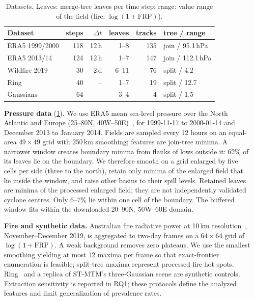 \documentclass[review]{vgtc}                 %
\begin{document}
\begin{table}[t]
\centering\small
\setlength{\tabcolsep}{3.5pt}
\begin{tabular}{lrrrrl}\toprule
Dataset & steps & $\Delta t$ & leaves & tracks & tree / range\\\midrule
ERA5 1999/2000 & 118 & 12\,h & 1--8 & 135 & join / 95.1\,hPa\\
ERA5 2013/14 & 124 & 12\,h & 1--7 & 147 & join / 112.1\,hPa\\
Wildfire 2019 & 30 & 2\,d & 6--11 & 76 & split / 4.2\\
Ring & 40 & -- & 1--7 & 19 & split / 12.7\\
Gaussians & 64 & -- & 3--4 & 4 & split / 1.5\\\bottomrule
\end{tabular}
\caption{Datasets. Leaves: merge-tree leaves per time step; range: value range of the field (fire: $\log(1+\mathrm{FRP})$).}
\label{tab:data}
\end{table}

\textbf{Pressure data} (\cref{tab:data}). We use ERA5 mean sea-level pressure over the North Atlantic and Europe (25--80\textdegree N, 40\textdegree W--50\textdegree E)~\cite{Hersbach:2020:ERA5}, for 1999-11-17 to 2000-01-14 and December 2013 to January 2014. Fields are sampled every 12 hours on an equal-area $49\times49$ grid with 250\,km smoothing; features are join-tree minima. A narrower window creates boundary minima from flanks of lows outside it: 62\% of its leaves lie on the boundary. We therefore smooth on a grid enlarged by five cells per side (three to the north), retain only minima of the enlarged field that lie inside the window, and raise other basins to their spill levels. Retained leaves are minima of the processed enlarged field; they are not independently validated cyclone centres. Only 6--7\% lie within one cell of the boundary. The buffered window fits within the downloaded 20--90\textdegree N, 50\textdegree W--60\textdegree E domain.

\textbf{Fire and synthetic data.} Australian fire radiative power at 10\,km resolution~\cite{Franke:2021:1DP}, November--December 2019, is aggregated to two-day frames on a $64\times64$ grid of $\log(1+\mathrm{FRP})$. A weak background removes zero plateaus. We use the smallest smoothing yielding at most 12 maxima per frame so that exact-frontier enumeration is feasible; split-tree maxima represent processed fire hot spots. Ring~\cite{Koepp:2023:TMTM,Franke:2021:1DP} and a replica of ST-MTM's three-Gaussian scene are synthetic controls. Extraction sensitivity is reported in RQ1; these protocols define the analyzed features and limit generalization of prevalence rates.
\end{document}
